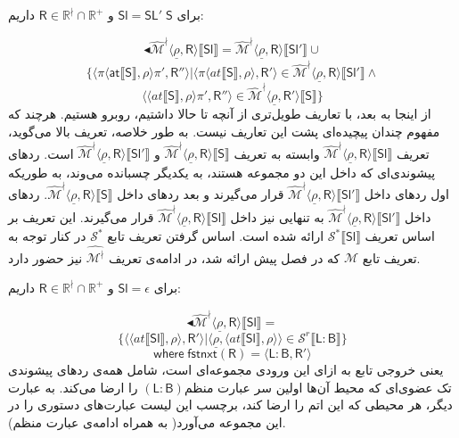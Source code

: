 برای $\mathsf{Sl=SL' \; S}$ و $\mathsf{R} \in \mathbb{R^\nmid} \cap \mathbb{R^+}$ داریم:

$$\blacktriangleleft\mathcal{\hat{M}^\nmid} \langle \underline{\rho}, \mathsf{R} \rangle \llbracket \mathsf{Sl} \rrbracket
=
\mathcal{\hat{M}^\nmid} \langle \underline{\rho}, \mathsf{R} \rangle \llbracket \mathsf{Sl'} \rrbracket
\cup$$ 
$$\{ \langle \pi \langle \mathsf{at}\llbracket \mathsf{S} \rrbracket, \rho \rangle \pi'
, \mathsf{R''} \rangle | \langle \pi \langle at \llbracket \mathsf{S}\rrbracket, \rho \rangle, \mathsf{R'} \rangle \in \mathcal{\hat{M}^\nmid}  \langle \underline{\rho} , \mathsf{R} \rangle \llbracket \mathsf{Sl'} \rrbracket\land$$
 $$\langle \langle at \llbracket \mathsf{S}\rrbracket , \rho \rangle \pi' , \mathsf{R''} \rangle \in \mathcal{\hat{M}^\nmid}
\langle \underline{\rho},\mathsf{R'} \rangle   \llbracket \mathsf{S} \rrbracket
 \}$$
از اینجا به بعد، با تعاریف طویل‌تری از آنچه تا حالا داشتیم، روبرو هستیم. هرچند که مفهوم چندان پیچیده‌ای پشت این تعاریف نیست. به ‌طور خلاصه، تعریف بالا می‌گوید، تعریف 
$\mathcal{\hat{M}^\nmid} \langle \underline{\rho}, \mathsf{R} \rangle \llbracket \mathsf{Sl} \rrbracket$
وابسته به تعریف 
$\mathcal{\hat{M}^\nmid} \langle \underline{\rho}, \mathsf{R} \rangle \llbracket \mathsf{S} \rrbracket$
و
$\mathcal{\hat{M}^\nmid} \langle \underline{\rho}, \mathsf{R} \rangle \llbracket \mathsf{Sl'} \rrbracket$
است. ردهای پیشوندی‌ای که داخل این دو مجموعه هستند، به یکدیگر چسبانده می‌وند، به‌ طوریکه اول ردهای داخل 
$\mathcal{\hat{M}^\nmid} \langle \underline{\rho}, \mathsf{R} \rangle \llbracket \mathsf{Sl'} \rrbracket$
قرار می‌گیرند و بعد ردهای داخل 
$\mathcal{\hat{M}^\nmid} \langle \underline{\rho}, \mathsf{R} \rangle \llbracket \mathsf{S} \rrbracket$.
ردهای داخل 
$\mathcal{\hat{M}^\nmid} \langle \underline{\rho}, \mathsf{R} \rangle \llbracket \mathsf{Sl'} \rrbracket$
به تنهایی نیز داخل 
$\mathcal{\hat{M}^\nmid} \langle \underline{\rho}, \mathsf{R} \rangle \llbracket \mathsf{Sl} \rrbracket$
قرار می‌گیرند. این تعریف بر اساس تعریف 
$\mathcal{S}^* \llbracket \mathsf{Sl} \rrbracket$
ارائه شده است. اساس گرفتن تعریف تابع 
$\mathcal{S}^*$
در کنار توجه به تعریف تابع 
$\mathcal{M}$
که در فصل پیش ارائه شد، در ادامه‌ی تعریف 
$\mathcal{\hat{M^\nmid}}$
	 نیز حضور دارد.

برای $\mathsf{Sl=\epsilon}$ و $\mathsf{R} \in \mathbb{R^\nmid} \cap \mathbb{R^+}$ داریم:

$$\blacktriangleleft\mathcal{\hat{M}^\nmid} \langle \underline{\rho}, \mathsf{R} \rangle \llbracket \mathsf{Sl} \rrbracket
=$$
$$\{ \langle \langle at \llbracket \mathsf{Sl} \rrbracket , \rho \rangle , \mathsf{R'} \rangle | \langle \underline{\rho} , \langle at \llbracket \mathsf{Sl} \rrbracket, \rho \rangle \rangle \in \mathcal{S}^r \llbracket \mathsf{L:B} \rrbracket
\}$$
$$\mathsf{where \; fstnxt(R)=\langle L:B,R' \rangle}$$
یعنی خروجی تابع به ازای این ورودی مجموعه‌ای است، شامل همه‌ی ردهای پیشوندی تک عضوی‌ای که محیط آن‌ها اولین سر عبارت منظم$(\mathsf{L:B})$ را ارضا می‌کند. به عبارت دیگر، هر محیطی که این اتم را ارضا کند، برچسب این لیست عبارت‌های دستوری را در این مجموعه می‌آورد( به همراه ادامه‌ی عبارت منظم).

